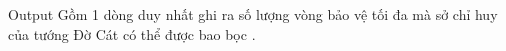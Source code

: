 Output
Gồm 1 dòng duy nhất ghi ra số lượng vòng bảo vệ tối đa mà sở chỉ huy của tướng Đờ Cát có thể được bao bọc .